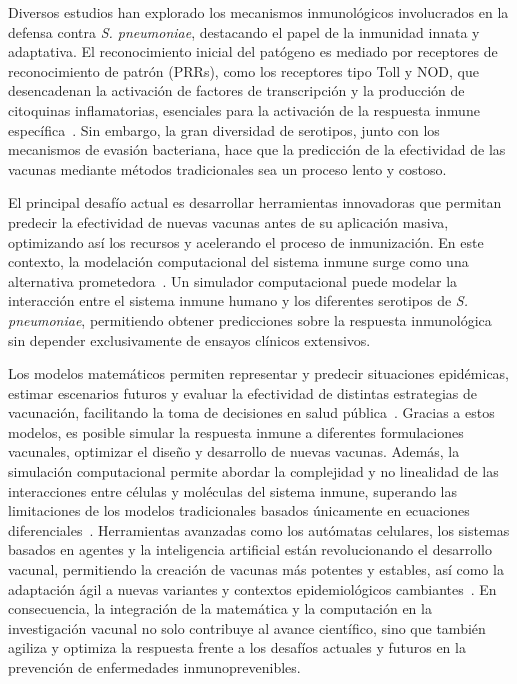 Diversos estudios han explorado los mecanismos inmunológicos involucrados en la defensa contra \textit{S. pneumoniae}, destacando el papel de la inmunidad innata y adaptativa. El reconocimiento inicial del patógeno es mediado por receptores de reconocimiento de patrón (PRRs), como los receptores tipo Toll y NOD, que desencadenan la activación de factores de transcripción y la producción de citoquinas inflamatorias, esenciales para la activación de la respuesta inmune específica~\cite{Janeway2002}. Sin embargo, la gran diversidad de serotipos, junto con los mecanismos de evasión bacteriana, hace que la predicción de la efectividad de las vacunas mediante métodos tradicionales sea un proceso lento y costoso.

El principal desafío actual es desarrollar herramientas innovadoras que permitan predecir la efectividad de nuevas vacunas antes de su aplicación masiva, optimizando así los recursos y acelerando el proceso de inmunización. En este contexto, la modelación computacional del sistema inmune surge como una alternativa prometedora~\cite{Castiglione2014}. Un simulador computacional puede modelar la interacción entre el sistema inmune humano y los diferentes serotipos de \textit{S. pneumoniae}, permitiendo obtener predicciones sobre la respuesta inmunológica sin depender exclusivamente de ensayos clínicos extensivos.

Los modelos matemáticos permiten representar y predecir situaciones epidémicas, estimar escenarios futuros y evaluar la efectividad de distintas estrategias de vacunación, facilitando la toma de decisiones en salud pública~\cite{SINC2021,UC3M2022}. Gracias a estos modelos, es posible simular la respuesta inmune a diferentes formulaciones vacunales, optimizar el diseño y desarrollo de nuevas vacunas. Además, la simulación computacional permite abordar la complejidad y no linealidad de las interacciones entre células y moléculas del sistema inmune, superando las limitaciones de los modelos tradicionales basados únicamente en ecuaciones diferenciales~\cite{UCI2007}. Herramientas avanzadas como los autómatas celulares, los sistemas basados en agentes y la inteligencia artificial están revolucionando el desarrollo vacunal, permitiendo la creación de vacunas más potentes y estables, así como la adaptación ágil a nuevas variantes y contextos epidemiológicos cambiantes~\cite{DW2023}. En consecuencia, la integración de la matemática y la computación en la investigación vacunal no solo contribuye al avance científico, sino que también agiliza y optimiza la respuesta frente a los desafíos actuales y futuros en la prevención de enfermedades inmunoprevenibles.

